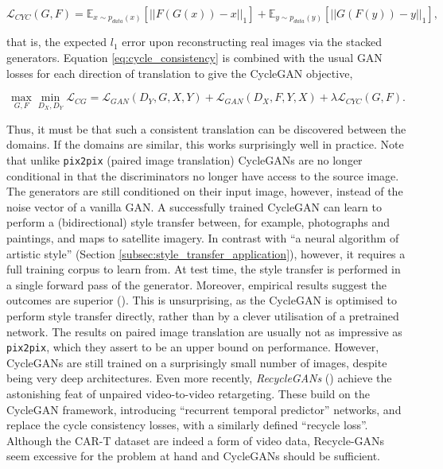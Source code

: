 \begin{equation}
\mathcal{L}_{CYC}(G, F) = \mathbb{E}_{x \sim p_{data}(x)}[||F(G(x)) - x||_1] + \mathbb{E}_{y \sim p_{data}(y)}[||G(F(y)) - y||_1],
\label{eq:cycle_consistency}
\end{equation}

that is, the expected $l_1$ error upon reconstructing real images via the stacked generators. Equation \ref{eq:cycle_consistency} is combined with the usual GAN losses for each direction of translation to give the CycleGAN objective,

\begin{equation}
\max_{G, F}\min_{D_X, D_Y} \mathcal{L}_{CG} = \mathcal{L}_{GAN}(D_Y, G, X, Y) + \mathcal{L}_{GAN}(D_X, F, Y, X) + \lambda\mathcal{L}_{CYC}(G, F).
\label{eq:cycle_gan}
\end{equation}

Thus, it must be that such a consistent translation can be discovered between the domains. If the domains are similar, this works surprisingly well in practice. Note that unlike \texttt{pix2pix} (paired image translation) CycleGANs are no longer conditional in that the discriminators no longer have access to the source image. The generators are still conditioned on their input image, however, instead of the noise vector of a vanilla GAN. A successfully trained CycleGAN can learn to perform a (bidirectional) style transfer between, for example, photographs and paintings, and maps to satellite imagery. In contrast with ``a neural algorithm of artistic style'' (Section \ref{subsec:style_transfer_application}), however, it requires a full training corpus to learn from. At test time, the style transfer is performed in a single forward pass of the generator. Moreover, empirical results suggest the outcomes are superior (\cite{isola2017image}). This is unsurprising, as the CycleGAN is optimised to perform style transfer directly, rather than by a clever utilisation of a pretrained network. The results on paired image translation are usually not as impressive as \texttt{pix2pix}, which they assert to be an upper bound on performance. However, CycleGANs are still trained on a surprisingly small number of images, despite being very deep architectures. Even more recently, \emph{RecycleGANs} (\cite{bansal2018recycle}) achieve the astonishing feat of unpaired video-to-video retargeting. These build on the CycleGAN framework, introducing ``recurrent temporal predictor'' networks, and replace the cycle consistency losses, with a similarly defined ``recycle loss''. Although the CAR-T dataset are indeed a form of video data, Recycle-GANs seem excessive for the problem at hand and CycleGANs should be sufficient.

